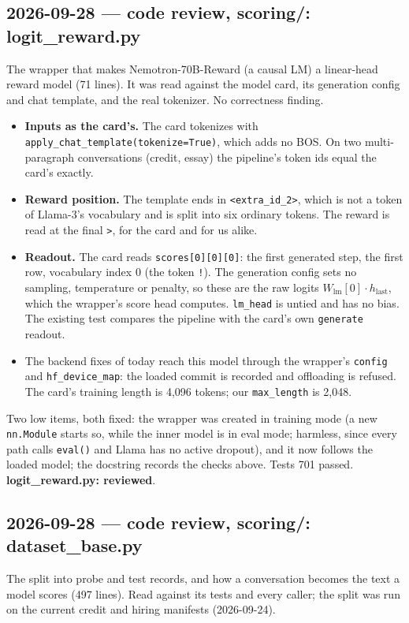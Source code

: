 \documentclass{article}
\begin{document}
\subsection*{2026-09-28 --- code review, scoring/: logit\_reward.py}
The wrapper that makes Nemotron-70B-Reward (a causal LM) a linear-head reward model (71 lines). It was read
against the model card, its generation config and chat template, and the real tokenizer. No correctness finding.
\begin{itemize}
  \item \textbf{Inputs as the card's.} The card tokenizes with \texttt{apply\_chat\_template(tokenize=True)}, which
        adds no BOS. On two multi-paragraph conversations (credit, essay) the pipeline's token ids equal the card's
        exactly.
  \item \textbf{Reward position.} The template ends in \texttt{<extra\_id\_2>}, which is not a token of Llama-3's
        vocabulary and is split into six ordinary tokens. The reward is read at the final \texttt{>}, for the card
        and for us alike.
  \item \textbf{Readout.} The card reads \texttt{scores[0][0][0]}: the first generated step, the first row,
        vocabulary index 0 (the token \texttt{!}). The generation config sets no sampling, temperature or
        penalty, so these are the raw logits $W_{\text{lm}}[0]\cdot h_{\text{last}}$, which the wrapper's score head
        computes. \texttt{lm\_head} is untied and has no bias. The existing test compares the pipeline with the
        card's own \texttt{generate} readout.
  \item The backend fixes of today reach this model through the wrapper's \texttt{config} and
        \texttt{hf\_device\_map}: the loaded commit is recorded and offloading is refused. The card's training
        length is 4,096 tokens; our \texttt{max\_length} is 2,048.
\end{itemize}
Two low items, both fixed: the wrapper was created in training mode (a new \texttt{nn.Module} starts so, while
the inner model is in eval mode; harmless, since every path calls \texttt{eval()} and Llama has no active
dropout), and it now follows the loaded model; the docstring records the checks above.
Tests 701 passed. \textbf{logit\_reward.py: reviewed}.

\subsection*{2026-09-28 --- code review, scoring/: dataset\_base.py}
The split into probe and test records, and how a conversation becomes the text a model scores (497 lines). Read
against its tests and every caller; the split was run on the current credit and hiring manifests (2026-09-24).
\end{document}
